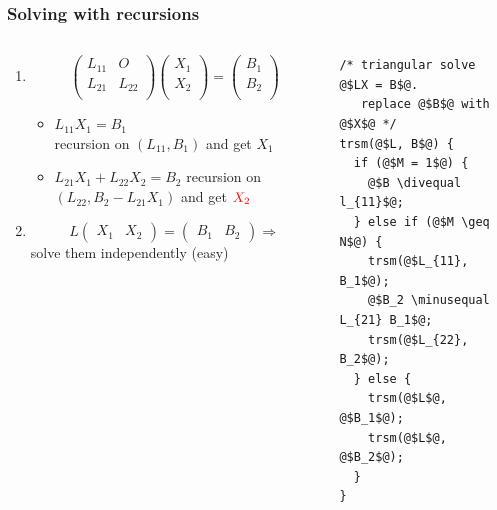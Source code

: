 \documentclass[12pt,dvipdfmx]{beamer}
\newcommand{\minusequal}{\mbox{\tt\ -= }}
\newcommand{\divequal}{\mbox{\tt\ /= }}
\newcommand{\ao}[1]{{\color{blue}#1}}
\newcommand{\aka}[1]{{\color{red}#1}}
\begin{document}
\begin{frame}[fragile]
\frametitle{Solving with recursions}

\begin{columns}[t]
\begin{column}{0.65\textwidth}
\begin{enumerate}
\item 
\[
\left(
\begin{array}{cc}
L_{11}     & O \\
L_{21}     & L_{22} \\
\end{array}
\right)
\left(
\begin{array}{c}
X_1     \\
X_2     \\
\end{array}
\right)
=
\left(
\begin{array}{c}
B_1 \\
B_2 \\
\end{array}
\right)
\]
\begin{itemize}
\item $L_{11} X_1 = B_1$ \\
recursion on $(L_{11}, B_1)$ and get \ao{$X_1$}
\item $L_{21} X_1 + L_{22} X_2 = B_2$
recursion on $(L_{22}, B_2 - L_{21} X_1)$ and get $\aka{X_2}$
\end{itemize}
\item 
\[ 
L
  \left(\begin{array}{cc} X_1 & X_2  \end{array}\right) = 
  \left(\begin{array}{cc} B_1 & B_2  \end{array}\right) 
  \Rightarrow
\]
solve them independently (easy)
\end{enumerate}
\end{column}

\begin{column}{0.35\textwidth}
\begin{lstlisting}[basicstyle=\scriptsize]
/* triangular solve @$LX = B$@. 
   replace @$B$@ with @$X$@ */
trsm(@$L, B$@) {
  if (@$M = 1$@) {
    @$B \divequal l_{11}$@;
  } else if (@$M \geq N$@) {
    trsm(@$L_{11}, B_1$@);
    @$B_2 \minusequal L_{21} B_1$@;
    trsm(@$L_{22}, B_2$@);
  } else {
    trsm(@$L$@, @$B_1$@);
    trsm(@$L$@, @$B_2$@);
  }
}
\end{lstlisting}
\end{column}
\end{columns}
\end{frame}
\end{document}
